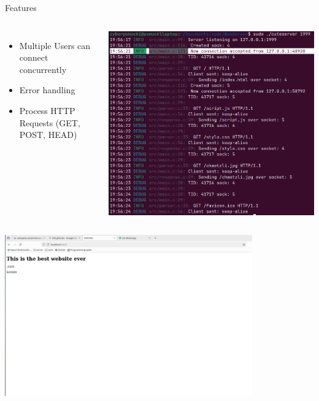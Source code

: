 \documentclass[aspectratio=169]{beamer}
\begin{document}
\begin{frame}[c]{Features}
    \begin{columns}[c]
           \begin{itemize}
               \item Multiple Users can connect concurrently 
               \item Error handling 
               \item Process HTTP Requests (GET, POST, HEAD)
           \end{itemize} 
            \includegraphics[width=\textwidth,height=\textheight,keepaspectratio]{keep-alive.png}
    \end{columns}
\end{frame}

\begin{frame}[c]{}
  \centering
\includegraphics[width=0.8\textwidth,height=\textheight,keepaspectratio]{01_bare_html.png}
\end{frame}
\end{document}
